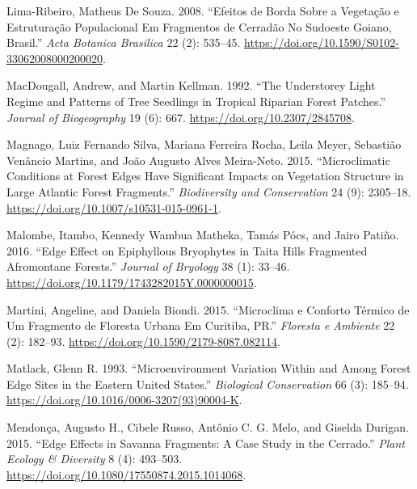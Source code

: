 \documentclass[
  12pt,
]{article}
\newlength{\cslhangindent}
\newenvironment{CSLReferences}[2] %
 {\begin{list}{}{%
  \setlength{\itemindent}{0pt}
  \setlength{\leftmargin}{0pt}
  \setlength{\parsep}{0pt}
  \ifodd #1
   \setlength{\leftmargin}{\cslhangindent}
   \setlength{\itemindent}{-1\cslhangindent}
  \fi
  \setlength{\itemsep}{#2\baselineskip}}}
 {\end{list}}
\begin{document}
\begin{CSLReferences}{1}{0}
Lima-Ribeiro, Matheus De Souza. 2008. {``Efeitos de Borda Sobre a
Vegetação e Estruturação Populacional Em Fragmentos de {Cerradão} No
{Sudoeste} {Goiano}, {Brasil}.''} \emph{Acta Botanica Brasilica} 22 (2):
535--45. \url{https://doi.org/10.1590/S0102-33062008000200020}.

MacDougall, Andrew, and Martin Kellman. 1992. {``The {Understorey}
{Light} {Regime} and {Patterns} of {Tree} {Seedlings} in {Tropical}
{Riparian} {Forest} {Patches}.''} \emph{Journal of Biogeography} 19 (6):
667. \url{https://doi.org/10.2307/2845708}.

Magnago, Luiz Fernando Silva, Mariana Ferreira Rocha, Leila Meyer,
Sebastião Venâncio Martins, and João Augusto Alves Meira-Neto. 2015.
{``Microclimatic Conditions at Forest Edges Have Significant Impacts on
Vegetation Structure in Large {Atlantic} Forest Fragments.''}
\emph{Biodiversity and Conservation} 24 (9): 2305--18.
\url{https://doi.org/10.1007/s10531-015-0961-1}.

Malombe, Itambo, Kennedy Wambua Matheka, Tamás Pócs, and Jairo Patiño.
2016. {``Edge Effect on Epiphyllous Bryophytes in {Taita} {Hills}
Fragmented Afromontane Forests.''} \emph{Journal of Bryology} 38 (1):
33--46. \url{https://doi.org/10.1179/1743282015Y.0000000015}.

Martini, Angeline, and Daniela Biondi. 2015. {``Microclima e {Conforto}
{Térmico} de Um {Fragmento} de {Floresta} {Urbana} Em {Curitiba},
{PR}.''} \emph{Floresta e Ambiente} 22 (2): 182--93.
\url{https://doi.org/10.1590/2179-8087.082114}.

Matlack, Glenn R. 1993. {``Microenvironment Variation Within and Among
Forest Edge Sites in the Eastern {United} {States}.''} \emph{Biological
Conservation} 66 (3): 185--94.
\url{https://doi.org/10.1016/0006-3207(93)90004-K}.

Mendonça, Augusto H., Cibele Russo, Antônio C. G. Melo, and Giselda
Durigan. 2015. {``Edge Effects in Savanna Fragments: A Case Study in the
Cerrado.''} \emph{Plant Ecology \& Diversity} 8 (4): 493--503.
\url{https://doi.org/10.1080/17550874.2015.1014068}.


\end{CSLReferences}
\end{document}
